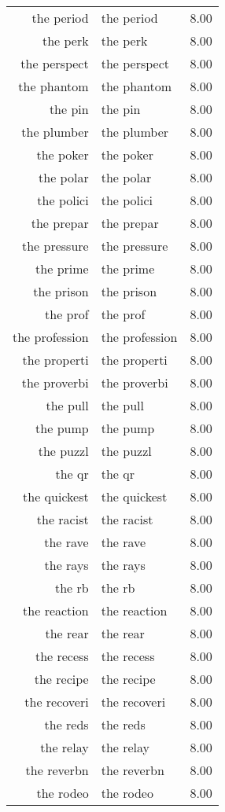 \begin{table}[ht]
\begin{tabular}{rlr}
  the period & the period & 8.00 \\ 
  the perk & the perk & 8.00 \\ 
  the perspect & the perspect & 8.00 \\ 
  the phantom & the phantom & 8.00 \\ 
  the pin & the pin & 8.00 \\ 
  the plumber & the plumber & 8.00 \\ 
  the poker & the poker & 8.00 \\ 
  the polar & the polar & 8.00 \\ 
  the polici & the polici & 8.00 \\ 
  the prepar & the prepar & 8.00 \\ 
  the pressure & the pressure & 8.00 \\ 
  the prime & the prime & 8.00 \\ 
  the prison & the prison & 8.00 \\ 
  the prof & the prof & 8.00 \\ 
  the profession & the profession & 8.00 \\ 
  the properti & the properti & 8.00 \\ 
  the proverbi & the proverbi & 8.00 \\ 
  the pull & the pull & 8.00 \\ 
  the pump & the pump & 8.00 \\ 
  the puzzl & the puzzl & 8.00 \\ 
  the qr & the qr & 8.00 \\ 
  the quickest & the quickest & 8.00 \\ 
  the racist & the racist & 8.00 \\ 
  the rave & the rave & 8.00 \\ 
  the rays & the rays & 8.00 \\ 
  the rb & the rb & 8.00 \\ 
  the reaction & the reaction & 8.00 \\ 
  the rear & the rear & 8.00 \\ 
  the recess & the recess & 8.00 \\ 
  the recipe & the recipe & 8.00 \\ 
  the recoveri & the recoveri & 8.00 \\ 
  the reds & the reds & 8.00 \\ 
  the relay & the relay & 8.00 \\ 
  the reverbn & the reverbn & 8.00 \\ 
  the rodeo & the rodeo & 8.00 \\ 

\end{tabular}
\end{table}
